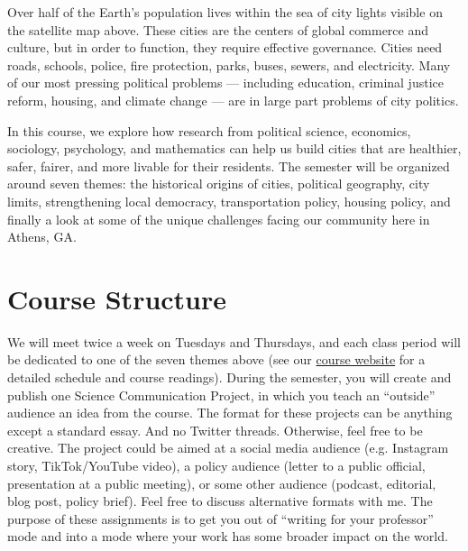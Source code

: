 \documentclass[11pt, letterpaper]{article}
\begin{document}
\noindent Over half of the Earth's population lives within the sea of city lights visible on the satellite map above. These cities are the centers of global commerce and culture, but in order to function, they require effective governance. Cities need roads, schools, police, fire protection, parks, buses, sewers, and electricity. Many of our most pressing political problems --- including education, criminal justice reform, housing, and climate change --- are in large part problems of city politics.

In this course, we explore how research from political science, economics, sociology, psychology, and mathematics can help us build cities that are healthier, safer, fairer, and more livable for their residents. The semester will be organized around seven themes: the historical origins of cities, political geography, city limits, strengthening local democracy, transportation policy, housing policy, and finally a look at some of the unique challenges facing our community here in Athens, GA. 



\section*{Course Structure}

We will meet twice a week on Tuesdays and Thursdays, and each class period will be dedicated to one of the seven themes above (see our \href{https://joeornstein.github.io/pols-4641/}{course website} for a detailed schedule and course readings). During the semester, you will create and publish one Science Communication Project, in which you teach an ``outside'' audience an idea from the course. The format for these projects can be anything except a standard essay. And no Twitter threads. Otherwise, feel free to be creative. The project could be aimed at a social media audience (e.g. Instagram story, TikTok/YouTube video), a policy audience (letter to a public official, presentation at a public meeting), or some other audience (podcast, editorial, blog post, policy brief). Feel free to discuss alternative formats with me. The purpose of these assignments is to get you out of ``writing for your professor'' mode and into a mode where your work has some broader impact on the world.
\end{document}
